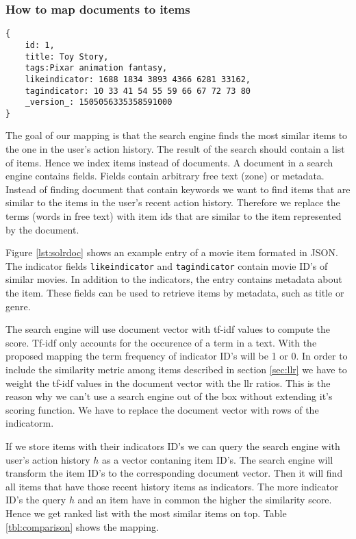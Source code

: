 \subsubsection{How to map documents to items}

\begin{lstlisting}[caption={Item metadata and similar items are stored in Solr.},label={lst:solrdoc}]
{
    id: 1,
    title: Toy Story,
    tags:Pixar animation fantasy,
    likeindicator: 1688 1834 3893 4366 6281 33162,
    tagindicator: 10 33 41 54 55 59 66 67 72 73 80
    _version_: 1505056335358591000
}
\end{lstlisting}

The goal of our mapping is that the search engine finds the most similar items to the one in the user's action history.
The result of the search should contain a list of items. Hence we index items instead of documents.
A document in a search engine contains fields. Fields contain arbitrary free text (zone) or metadata. 
Instead of finding document that contain keywords we want to find items that are similar to the items in the user's recent action history. Therefore we replace the terms (words in free text) with item ids that are similar to the item represented by the document. 

Figure \ref{lst:solrdoc} shows an example entry of a movie item formated in JSON. The indicator fields \verb|likeindicator| and \verb|tagindicator| contain movie ID's of similar movies. In addition to the indicators, the entry contains metadata about the item. These fields can be used to retrieve items by metadata, such as title or genre.

The search engine will use document vector with tf-idf values to compute the score. Tf-idf only accounts for the occurence of a term in a text. With the proposed mapping the term frequency of indicator ID's will be 1 or 0. In order to include the similarity metric among items described in section \ref{sec:llr} we have to weight the tf-idf values in the document vector with the \gls{llr} ratios. This is the reason why we can't use a search engine out of the box without extending it's scoring function.
We have to replace the document vector with rows of the \gls{indicatorm}. 

If we store items with their indicators ID's we can query the search engine with user's action history $h$ as a vector contaning item ID's. The search engine will transform the item ID's to the corresponding document vector. Then it will find all items that have those recent history items as indicators. The more indicator ID's the query $h$ and an item have in common the higher the similarity score. Hence we get ranked list with the most similar items on top. Table \ref{tbl:comparison} shows the mapping.

